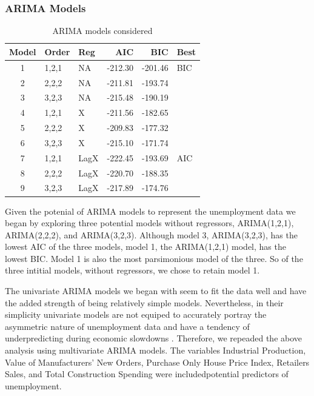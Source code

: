 \documentclass[twoside,twocolumn]{article}
\begin{document}
\subsubsection{ARIMA Models}
\begin{table}[htb]
\centering
\caption{ARIMA models considered}
\label{tab:arimachoices}
\begin{tabular}{cllrrl}
  \hline
 Model & Order & Reg  & AIC & BIC & Best \\ 
  \hline
1 & 1,2,1 &  NA &   -212.30 & -201.46 & BIC \\ 
  2  & 2,2,2 & NA   & -211.81 & -193.74 &  \\ 
  3  & 3,2,3 &  NA  & -215.48 & -190.19 &  \\ 
  4  & 1,2,1 & X  & -211.56 & -182.65 &  \\ 
  5  & 2,2,2 & X   & -209.83 & -177.32 &  \\ 
  6  & 3,2,3 & X   & -215.10 & -171.74 &  \\ 
  7  & 1,2,1 &  LagX & -222.45 & -193.69 & AIC \\ 
  8  & 2,2,2 &  LagX & -220.70 & -188.35 &  \\ 
  9  & 3,2,3 &  LagX & -217.89 & -174.76 &  \\ 
   \hline
\end{tabular}
\end{table}

Given the potenial of ARIMA models to represent the unemployment data we began by exploring three potential models without regressors, ARIMA(1,2,1), ARIMA(2,2,2), and ARIMA(3,2,3). Although model 3, ARIMA(3,2,3), has the lowest AIC of the three models, model 1, the ARIMA(1,2,1) model, has the lowest BIC. Model 1 is also the most parsimonious model of the three. So of the three intitial models, without regressors, we chose to retain model 1.  

The univariate ARIMA models we began with seem to fit the data well and have the added strength of being relatively simple models. Nevertheless, in their simplicity univariate models are not equiped to accurately portray the asymmetric nature of unemployment data and have a tendency of underpredicting during economic slowdowns \citep{Montgomery1998}. Therefore, we repeaded the above analysis using multivariate ARIMA models.  The variables Industrial Production, Value of Manufacturers' New Orders, Purchase Only House Price Index,  Retailers Sales, and Total Construction Spending were includedpotential predictors of unemployment. 
\end{document}

